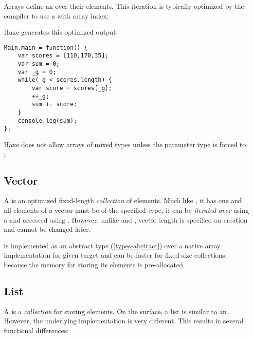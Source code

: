 Arrays define an  over their elements. This iteration is typically optimized by the compiler to use a  with array index:


Haxe generates this optimized  output:

\begin{lstlisting}
Main.main = function() {
	var scores = [110,170,35];
	var sum = 0;
	var _g = 0;
	while(_g < scores.length) {
		var score = scores[_g];
		++_g;
		sum += score;
	}
	console.log(sum);
};
\end{lstlisting}

Haxe does not allow arrays of mixed types unless the parameter type is forced to :




\subsection{Vector}
\label{std-vector}

A  is an optimized fixed-length \emph{collection} of elements. Much like , it has one  and all elements of a vector must be of the specified type, it can be \emph{iterated over} using a  and accessed using . However, unlike  and , vector length is specified on creation and cannot be changed later.


 is implemented as an abstract type (\ref{types-abstract}) over a native array implementation for given target and can be faster for fixed-size collections, because the memory for storing its elements is pre-allocated.

\subsection{List}
\label{std-List}
A  is a \emph{collection} for storing elements.  On the surface, a list is similar to an .  However, the underlying implementation is very different.  This results in several functional differences:

